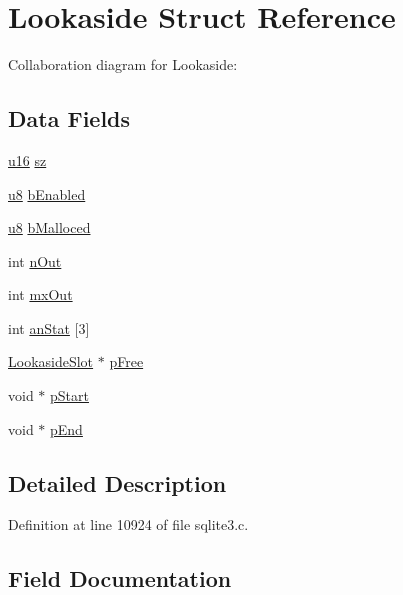 \hypertarget{struct_lookaside}{}\section{Lookaside Struct Reference}
\label{struct_lookaside}


Collaboration diagram for Lookaside\+:
\subsection*{Data Fields}
\begin{DoxyCompactItemize}
\item 
\hyperlink{sqlite3_8c_a20f2299e322dcbde37cb07b16910b843}{u16} \hyperlink{struct_lookaside_a4e3ef9f118930ad5f278baeac3bac99b}{sz}
\item 
\hyperlink{sqlite3_8c_a74a0f6424ae628af25f23f0a35f6ead3}{u8} \hyperlink{struct_lookaside_a79af6c4320daf4bbfbd9826e21ceaddd}{b\+Enabled}
\item 
\hyperlink{sqlite3_8c_a74a0f6424ae628af25f23f0a35f6ead3}{u8} \hyperlink{struct_lookaside_a909462308d1ae0363b162f8c83380d34}{b\+Malloced}
\item 
int \hyperlink{struct_lookaside_a0267c0890971fec4298dbc1bb12a61c2}{n\+Out}
\item 
int \hyperlink{struct_lookaside_a44be08721ee9a3463850ba5e8a648442}{mx\+Out}
\item 
int \hyperlink{struct_lookaside_a80bed23befd958684c107285728aae2e}{an\+Stat} \mbox{[}3\mbox{]}
\item 
\hyperlink{struct_lookaside_slot}{Lookaside\+Slot} $\ast$ \hyperlink{struct_lookaside_a3f76935e48e387e3fa0bff445ba3d57e}{p\+Free}
\item 
void $\ast$ \hyperlink{struct_lookaside_acad0645c70006ebafa3cb05e3679ce20}{p\+Start}
\item 
void $\ast$ \hyperlink{struct_lookaside_a7bf8b8d5988d9c99e8963fe07c9e41d1}{p\+End}
\end{DoxyCompactItemize}


\subsection{Detailed Description}


Definition at line 10924 of file sqlite3.\+c.



\subsection{Field Documentation}
\hypertarget{struct_lookaside_a80bed23befd958684c107285728aae2e}{}
